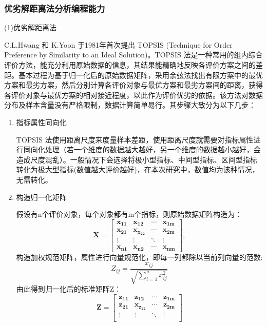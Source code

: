 \documentclass[UTF8]{ctexart}
\begin{document}
	\subsubsection{优劣解距离法分析编程能力}
	\par(1)优劣解距离法
	\par C.L.Hwang 和 K.Yoon 于1981年首次提出 TOPSIS (Technique for Order Preference by Similarity to an Ideal Solution)。TOPSIS 法是一种常用的组内综合评价方法，能充分利用原始数据的信息，其结果能精确地反映各评价方案之间的差距。基本过程为基于归一化后的原始数据矩阵，采用余弦法找出有限方案中的最优方案和最劣方案，然后分别计算各评价对象与最优方案和最劣方案间的距离，获得各评价对象与最优方案的相对接近程度，以此作为评价优劣的依据。该方法对数据分布及样本含量没有严格限制，数据计算简单易行。其步骤大致分为以下几步：
	\begin{enumerate}
		\item 指标属性同向化
		\par TOPSIS 法使用距离尺度来度量样本差距，使用距离尺度就需要对指标属性进行同向化处理（若一个维度的数据越大越好，另一个维度的数据越小越好，会造成尺度混乱）。一般情况下会选择将极小型指标、中间型指标、区间型指标转化为极大型指标(数值越大评价越好)，在本次研究中，数值均为该种情况，无需转化。
		\item 构造归一化矩阵
		\par 假设有n个评价对象，每个对象都有m个指标，则原始数据矩阵构造为：
		\begin{equation}
		\bm{X} =
		\begin{bmatrix}
		\bm{x_{11}} & \bm{x_{12}} & \cdots & \bm{x_{1m}} \\
		\bm{x_{21}} & \bm{x_{x_{22}}} & \cdots & \bm{x_{2m}} \\
		\vdots & \vdots &  \ddots & \vdots \\
		\bm{x_{n1}} & \bm{x_{n2}} & \cdots & \bm{x_{nm}}
		\end{bmatrix},
		\end{equation}
		构造加权规范矩阵，属性进行向量规范化，即每一列都除以当前列向量的范数:
		\begin{equation}
		Z_{ij}=\frac{x_{ij}}{\sqrt{\sum_{i=1}^n x_{ij}^2}}
		\end{equation}	
		由此得到归一化后的标准矩阵Z：
		\begin{equation}
		\bm{Z} =
		\begin{bmatrix}
		\bm{z_{11}} & \bm{z_{12}} & \cdots & \bm{z_{1m}} \\
		\bm{z_{21}} & \bm{x_{z_{22}}} & \cdots & \bm{z_{2m}} \\
		\vdots & \vdots &  \ddots & \vdots \\

\end{bmatrix}
\end{equation}
\end{enumerate}
\end{document}
